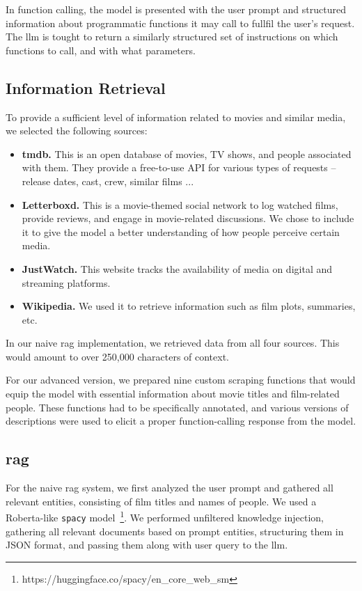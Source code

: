 \documentclass[fleqn,moreauthors,10pt]{ds_report}
\begin{document}
In function calling, the model is presented with the user prompt and structured information about programmatic functions it may call to fullfil the user's request. The \ac{llm} is tought to return a similarly structured set of instructions on which functions to call, and with what parameters.

\subsection*{Information Retrieval}

To provide a sufficient level of information related to movies and similar media, we selected the following sources:

\begin{itemize}
 \setlength\itemsep{-0.3em}
    \item \textbf{\ac{tmdb}.} This is an open database of movies, TV shows, and people associated with them. They provide a free-to-use API for various types of requests -- release dates, cast, crew, similar films ...
    \item \textbf{Letterboxd.} This is a movie-themed social network to log watched films, provide reviews, and engage in movie-related discussions. We chose to include it to give the model a better understanding of how people perceive certain media.
    \item \textbf{JustWatch.} This website tracks the availability of media on digital and streaming platforms.
    \item \textbf{Wikipedia.} We used it to retrieve information such as film plots, summaries, etc.
\end{itemize}

In our naive \ac{rag} implementation, we retrieved data from all four sources. This would amount to over 250,000 characters of context.

For our advanced version, we prepared nine custom scraping functions that would equip the model with essential information about movie titles and film-related people. These functions had to be specifically annotated, and various versions of descriptions were used to elicit a proper function-calling response from the model.

\subsection*{\ac{rag}}

For the naive \ac{rag} system, we first analyzed the user prompt and gathered all relevant entities, consisting of film titles and names of people. We used a Roberta-like \texttt{spacy} model~\footnote{https://huggingface.co/spacy/en\_core\_web\_sm}. We performed unfiltered knowledge injection, gathering all relevant documents based on prompt entities, structuring them in JSON format, and passing them along with user query to the \ac{llm}.
\end{document}

